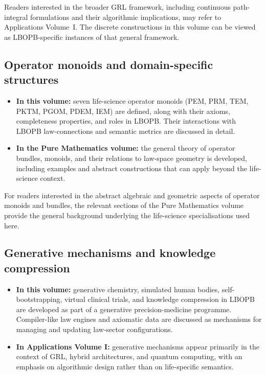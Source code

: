 \documentclass[11pt]{book}
\theoremstyle{plain}
\theoremstyle{definition}
\theoremstyle{remark}
\begin{document}
Readers interested in the broader GRL framework, including continuous
path-integral formulations and their algorithmic implications, may
refer to Applications Volume~I. The discrete constructions in this
volume can be viewed as LBOPB-specific instances of that general
framework.

\subsection*{Operator monoids and domain-specific structures}

\begin{itemize}
  \item \textbf{In this volume:}
        seven life-science operator monoids (PEM, PRM, TEM, PKTM,
        PGOM, PDEM, IEM) are defined, along with their axioms,
        completeness properties, and roles in LBOPB. Their interactions
        with LBOPB law-connections and semantic metrics are discussed
        in detail.
  \item \textbf{In the Pure Mathematics volume:}
        the general theory of operator bundles, monoids, and their
        relations to law-space geometry is developed, including
        examples and abstract constructions that can apply beyond the
        life-science context.
\end{itemize}

For readers interested in the abstract algebraic and geometric aspects
of operator monoids and bundles, the relevant sections of the Pure
Mathematics volume provide the general background underlying the
life-science specialisations used here.

\subsection*{Generative mechanisms and knowledge compression}

\begin{itemize}
  \item \textbf{In this volume:}
        generative chemistry, simulated human bodies, self-bootstrapping,
        virtual clinical trials, and knowledge compression in LBOPB are
        developed as part of a generative precision-medicine programme.
        Compiler-like law engines and axiomatic data are discussed as
        mechanisms for managing and updating law-sector configurations.
  \item \textbf{In Applications Volume I:}
        generative mechanisms appear primarily in the context of GRL,
        hybrid architectures, and quantum computing, with an emphasis
        on algorithmic design rather than on life-specific semantics.
\end{itemize}
\end{document}
